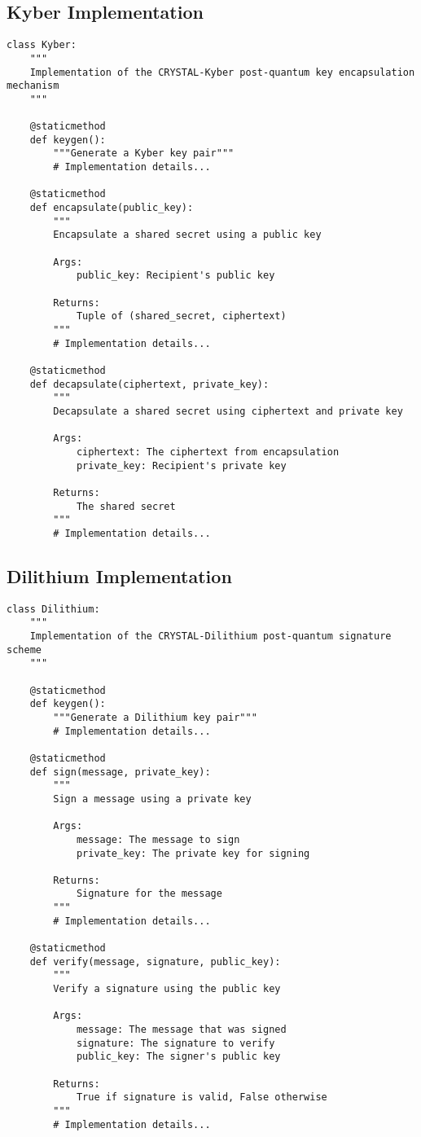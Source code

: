 \documentclass[12pt,a4paper]{report}
\begin{document}
\subsection{Kyber Implementation}
\begin{lstlisting}[style=python, caption=CRYSTAL-Kyber Implementation (simplified)]
class Kyber:
    """
    Implementation of the CRYSTAL-Kyber post-quantum key encapsulation mechanism
    """
    
    @staticmethod
    def keygen():
        """Generate a Kyber key pair"""
        # Implementation details...
        
    @staticmethod
    def encapsulate(public_key):
        """
        Encapsulate a shared secret using a public key
        
        Args:
            public_key: Recipient's public key
            
        Returns:
            Tuple of (shared_secret, ciphertext)
        """
        # Implementation details...
        
    @staticmethod
    def decapsulate(ciphertext, private_key):
        """
        Decapsulate a shared secret using ciphertext and private key
        
        Args:
            ciphertext: The ciphertext from encapsulation
            private_key: Recipient's private key
            
        Returns:
            The shared secret
        """
        # Implementation details...
\end{lstlisting}

\subsection{Dilithium Implementation}
\begin{lstlisting}[style=python, caption=CRYSTAL-Dilithium Implementation (simplified)]
class Dilithium:
    """
    Implementation of the CRYSTAL-Dilithium post-quantum signature scheme
    """
    
    @staticmethod
    def keygen():
        """Generate a Dilithium key pair"""
        # Implementation details...
        
    @staticmethod
    def sign(message, private_key):
        """
        Sign a message using a private key
        
        Args:
            message: The message to sign
            private_key: The private key for signing
            
        Returns:
            Signature for the message
        """
        # Implementation details...
        
    @staticmethod
    def verify(message, signature, public_key):
        """
        Verify a signature using the public key
        
        Args:
            message: The message that was signed
            signature: The signature to verify
            public_key: The signer's public key
            
        Returns:
            True if signature is valid, False otherwise
        """
        # Implementation details...
\end{lstlisting}
\end{document}
